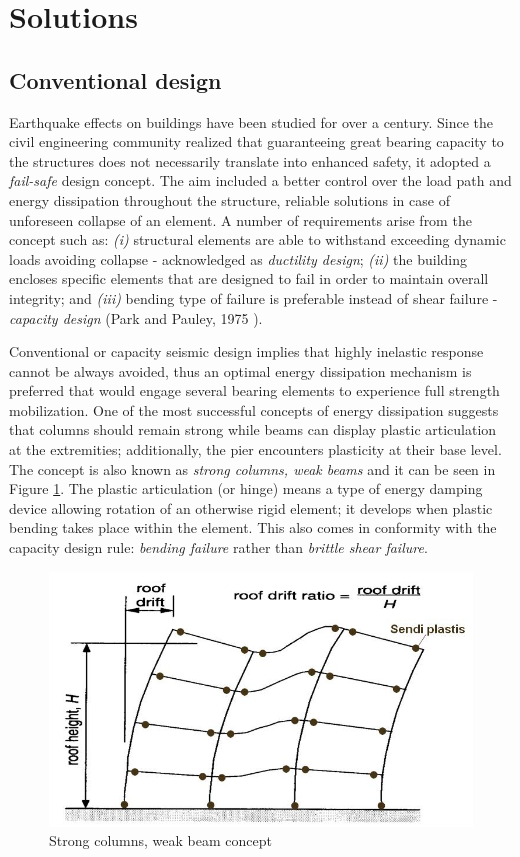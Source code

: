 \documentclass[12pt,a4paper]{report}
\begin{document}
\section{Solutions}
\subsection{Conventional design}
Earthquake effects on buildings have been studied for over a century. Since the civil engineering community realized that guaranteeing great bearing capacity to the structures does not necessarily translate into enhanced safety, it adopted a \textit{fail-safe} design concept. The aim included a better control over the load path and energy dissipation throughout the structure, reliable solutions in case of unforeseen collapse of an element. A number of requirements arise from the concept such as: \textit{(i)} structural elements are able to withstand exceeding dynamic loads avoiding collapse - acknowledged as \textit{ductility design}; \textit{(ii)} the building encloses specific elements that are designed to fail in order to maintain overall integrity; and \textit{(iii)} bending type of failure is preferable instead of shear failure - \textit{capacity design} (Park and Pauley, 1975 \cite{park1984seismic}).

Conventional or capacity seismic design implies that highly inelastic response cannot be always avoided, thus an optimal energy dissipation mechanism is preferred that would engage several bearing elements to experience full strength mobilization. One of the most successful concepts of energy dissipation suggests that columns should remain strong while beams can display plastic articulation at the extremities; additionally, the pier encounters plasticity at their base level. The concept is also known as \textit{strong columns, weak beams} and it can be seen in Figure \ref{strongCol}. The plastic articulation (or hinge) means a type of energy damping device allowing rotation of an otherwise rigid element; it develops when plastic bending takes place within the element. This also comes in conformity with the capacity design rule:  \textit{bending failure} rather than \textit{brittle shear failure}.

\begin{figure}[h!]
	\centering
	\includegraphics[width=0.5\linewidth]{"plastification"}
	\caption{Strong columns, weak beam concept}
	\label{strongCol}
\end{figure}
\end{document}
